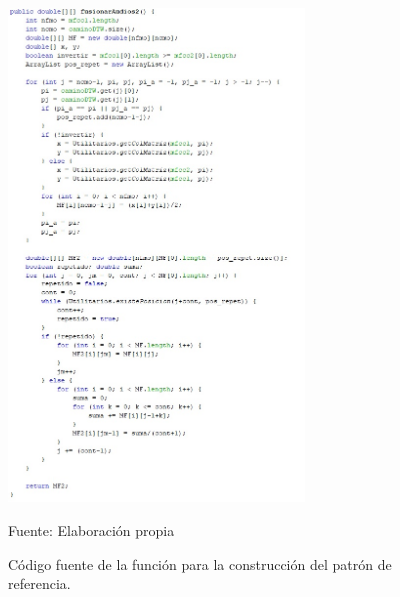 \begin{enumerate}
\begin{figure}[H]
\begin{center}
\includegraphics[width=0.7\textwidth]{Imagenes/Cap3/image034}
\end{center}
\begin{center}
\vskip -0.5cm
\caption{\small{Código fuente de la función para la construcción del patrón de referencia.}}
\label{fig:figura3.34}
{\small{Fuente: Elaboración propia}}
\end{center}
\end{figure}
\end{enumerate}

\newpage
